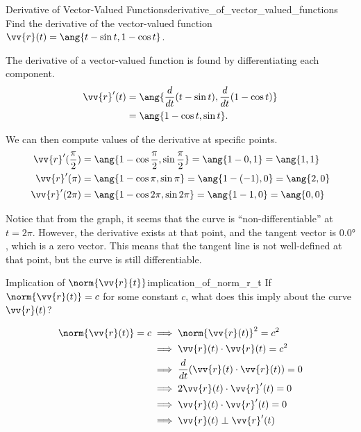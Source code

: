 \begin{problem}{Derivative of Vector-Valued Functions}{derivative_of_vector_valued_functions}
Find the derivative of the vector-valued function $\vv{r}(t) = \ang{t - \sin t, 1 - \cos t}$.
\end{problem}

\begin{sol}
The derivative of a vector-valued function is found by differentiating each component.
\begin{align*}
\vv{r}'(t) &= \ang{\frac{d}{dt}(t - \sin t), \frac{d}{dt}(1 - \cos t)} \\
&= \ang{1 - \cos t, \sin t}.
\end{align*}

We can then compute values of the derivative at specific points.
\begin{align*}
\vv{r}'(\dfrac{\pi}{2}) &= \ang{1 - \cos \dfrac{\pi}{2}, \sin \dfrac{\pi}{2}} = \ang{1 - 0, 1} = \ang{1, 1} \\
\vv{r}'(\pi) &= \ang{1 - \cos \pi, \sin \pi} = \ang{1 - (-1), 0} = \ang{2, 0} \\
\vv{r}'(2\pi) &= \ang{1 - \cos 2\pi, \sin 2\pi} = \ang{1 - 1, 0} = \ang{0, 0}
\end{align*}
\end{sol}

Notice that from the graph, it seems that the curve is ``non-differentiable'' at $t = 2\pi$. However, the derivative exists at that point, and the tangent vector is $\ang{0, 0}$, which is a zero vector. This means that the tangent line is not well-defined at that point, but the curve is still differentiable.

\begin{problem}{Implication of $\norm{\vv{r}{t}}$}{implication_of_norm_r_t}
If $\norm{\vv{r}(t)} = c$ for some constant $c$, what does this imply about the curve $\vv{r}(t)$?
\end{problem}

\begin{sol}
\begin{align*}
\norm{\vv{r}(t)} = c &\implies \norm{\vv{r}(t)}^2 = c^2 \\
&\implies \vv{r}(t) \cdot \vv{r}(t) = c^2 \\
&\implies \frac{d}{dt}(\vv{r}(t) \cdot \vv{r}(t)) = 0 \\
&\implies 2\vv{r}(t) \cdot \vv{r}'(t) = 0 \\
&\implies \vv{r}(t) \cdot \vv{r}'(t) = 0 \\
&\implies \vv{r}(t) \perp \vv{r}'(t)
\end{align*}
\end{sol}